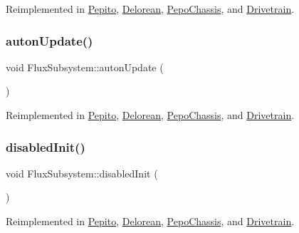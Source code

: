 Reimplemented in \hyperlink{classPepito_ac9a8b75ef48cd95683733af317618ca4}{Pepito}, \hyperlink{classDelorean_ad06990e5c59d5f4d30b48015e744cc49}{Delorean}, \hyperlink{classPepoChassis_a10380f1dad79ff1daa295d0673a1051f}{Pepo\+Chassis}, and \hyperlink{classDrivetrain_a6aec7fa1a9daf1233a59fe0243d3bc8c}{Drivetrain}.

\mbox{\label{classFluxSubsystem_aceed900af22503022b8d1278f3693f77}} 
\subsubsection{\texorpdfstring{auton\+Update()}{autonUpdate()}}
{\footnotesize\ttfamily void Flux\+Subsystem\+::auton\+Update (\begin{DoxyParamCaption}{ }\end{DoxyParamCaption})\hspace{0.3cm}{\ttfamily [virtual]}}



Reimplemented in \hyperlink{classPepito_a42cc57495399c63940571b113e7140f8}{Pepito}, \hyperlink{classDelorean_a17c9b875c9c0d3c9b9dadd5838bfedfd}{Delorean}, \hyperlink{classPepoChassis_ab1e73685898517c8fa2f81c5c7a6a56c}{Pepo\+Chassis}, and \hyperlink{classDrivetrain_ab451b48c598fa715ff1a8117ddc6f705}{Drivetrain}.

\mbox{\label{classFluxSubsystem_aa0b8fde8aa5094627d15d24e545e1da4}} 
\subsubsection{\texorpdfstring{disabled\+Init()}{disabledInit()}}
{\footnotesize\ttfamily void Flux\+Subsystem\+::disabled\+Init (\begin{DoxyParamCaption}{ }\end{DoxyParamCaption})\hspace{0.3cm}{\ttfamily [virtual]}}



Reimplemented in \hyperlink{classPepito_a04a85eae33c653f9555b6db43d50b210}{Pepito}, \hyperlink{classDelorean_ae054ba79b38b46d20e50becb5d31884c}{Delorean}, \hyperlink{classPepoChassis_af5f6848de51ac4c47cbf2f9f706b1485}{Pepo\+Chassis}, and \hyperlink{classDrivetrain_ac6fe041de609bdb45eac65282fbdf507}{Drivetrain}.

